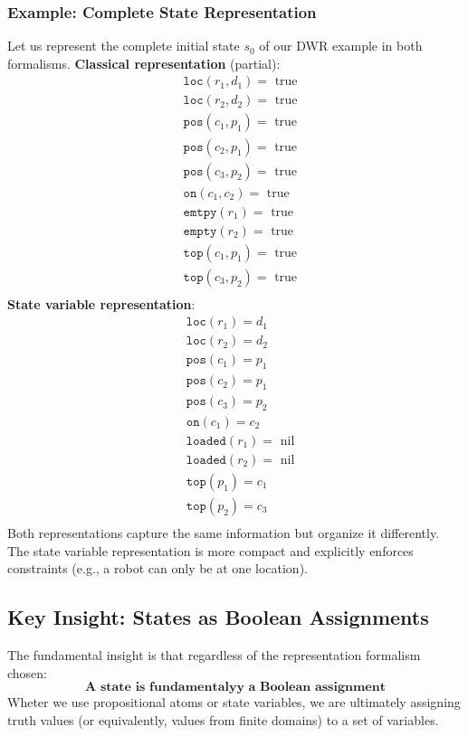 \documentclass[a4paper]{article}
\theoremstyle{definition}
\begin{document}
\subsubsection{Example: Complete State Representation}
Let us represent the complete initial state \( s_0 \) of our DWR example in both formalisms.
\vspace{1em}
\noindent
\newline
\textbf{Classical representation} (partial):
\begin{align*}
    &\texttt{loc}(r_1,d_1) = \text{ true}\\
    &\texttt{loc}(r_2,d_2) = \text{ true}\\
    &\texttt{pos}(c_1,p_1) = \text{ true}\\
    &\texttt{pos}(c_2,p_1) = \text{ true}\\
    &\texttt{pos}(c_3,p_2) = \text{ true}\\
    &\texttt{on}(c_1,c_2) = \text{ true}\\
    &\texttt{emtpy}(r_1) = \text{ true}\\
    &\texttt{empty}(r_2) = \text{ true}\\
    &\texttt{top}(c_1,p_1) = \text{ true}\\
    &\texttt{top}(c_3,p_2) = \text{ true}\\
\end{align*}
\textbf{State variable representation}:
\begin{align*}
    &\texttt{loc}(r_1) = d_1 \\
    &\texttt{loc}(r_2) = d_2 \\
    &\texttt{pos}(c_1) = p_1 \\
    &\texttt{pos}(c_2) = p_1 \\
    &\texttt{pos}(c_3) = p_2 \\
    &\texttt{on}(c_1) = c_2 \\
    &\texttt{loaded}(r_1) = \text{ nil}\\
    &\texttt{loaded}(r_2) = \text{ nil}\\
    &\texttt{top}(p_1) = c_1 \\
    &\texttt{top}(p_2) = c_3 \\ 
\end{align*}
Both representations capture the same information but organize it differently. The state variable representation is more compact 
and explicitly enforces constraints (e.g., a robot can only be at one location).
\subsection{Key Insight: States as Boolean Assignments}
The fundamental insight is that regardless of the representation formalism chosen:
\[
  \textbf{A state is fundamentalyy a Boolean assignment}
\]
Wheter we use propositional atoms or state variables, we are ultimately assigning truth values (or equivalently, values from finite domains) to a set of variables.
\end{document}
